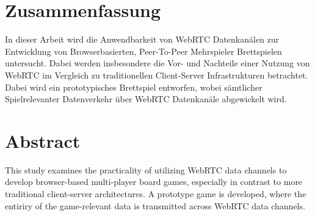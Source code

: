 \chapter*{Zusammenfassung}

In dieser Arbeit wird die Anwendbarkeit von WebRTC Datenkanälen zur Entwicklung von Browserbasierten, Peer-To-Peer Mehrspieler Brettspielen untersucht. Dabei werden insbesondere die Vor- und Nachteile einer Nutzung von WebRTC im Vergleich zu traditionellen Client-Server Infrastrukturen betrachtet. Dabei wird ein prototypisches Brettspiel entworfen, wobei sämtlicher Spielrelevanter Datenverkehr über WebRTC Datenkanäle abgewickelt wird.\par

\chapter*{Abstract}
This study examines the practicality of utilizing WebRTC data channels to develop browser-based multi-player board games, especially in contrast to more traditional client-server architectures. A prototype game is developed, where the entiriry of the game-relevant data is transmitted across WebRTC data channels.
